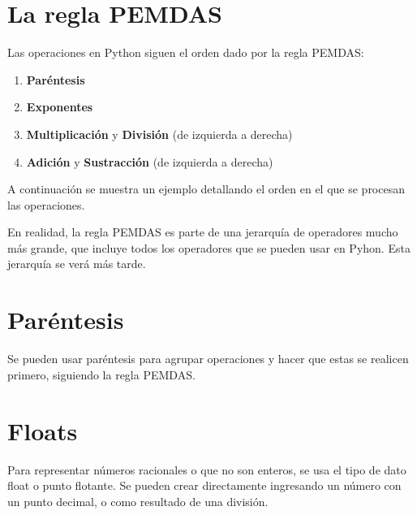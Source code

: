 \section{La regla PEMDAS}

Las operaciones en Python siguen el orden dado por la regla PEMDAS:

\begin{enumerate}
  \item \textbf{Paréntesis} \ttt{()}
  
  \item \textbf{Exponentes} \ttt{**}
  
  \item \textbf{Multiplicación} \ttt{*} y \textbf{División} \ttt{/} (de izquierda a derecha)
  
  \item \textbf{Adición} \ttt{+} y \textbf{Sustracción} \ttt{-} (de izquierda a derecha)
  
\end{enumerate}

A continuación se muestra un ejemplo detallando el orden en el que se procesan las operaciones.


En realidad, la regla PEMDAS es parte de una jerarquía de operadores mucho más grande, que incluye todos los operadores que se pueden usar en Pyhon.
Esta jerarquía se verá más tarde.

\section{Paréntesis}

Se pueden usar paréntesis \ttt{()} para agrupar operaciones y hacer que estas se realicen primero, siguiendo la regla PEMDAS.


\section{Floats}
    
Para representar números racionales o que no son enteros, se usa el tipo de dato float o punto flotante.
Se pueden crear directamente ingresando un número con un punto decimal, o como resultado de una división.

